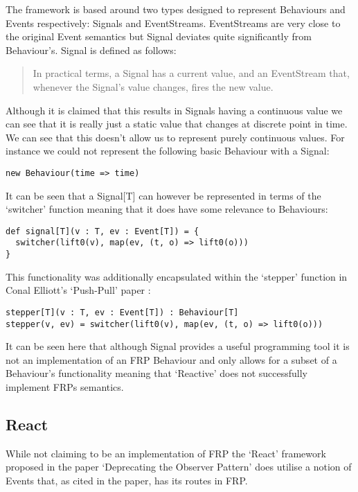       The framework is based around two types designed to represent Behaviours and Events respectively: Signals
      and EventStreams. EventStreams are very close to the original Event semantics but Signal deviates quite significantly from 
      Behaviour's. Signal is defined as follows:

      \begin{quote}
        In practical terms, a Signal has a current value, and an EventStream that, whenever the Signal's value changes,     
        fires the new value.
      \end{quote}  

      Although it is claimed that this results in Signals having a continuous value we can see
      that it is really just a static value that changes at discrete point in
      time. We can see that this doesn't allow us to represent purely continuous values. For instance
      we could not represent the following basic Behaviour with a Signal:

\begin{verbatim}
new Behaviour(time => time)
\end{verbatim}

      It can be seen that a Signal[T] can however be represented in terms
      of the `switcher' function meaning that it does have some relevance to Behaviours:

\begin{verbatim}
def signal[T](v : T, ev : Event[T]) = {
  switcher(lift0(v), map(ev, (t, o) => lift0(o)))
}
\end{verbatim}  

      This functionality was additionally encapsulated within the `stepper' function in Conal Elliott's
      `Push-Pull' paper \cite{Elliott2009}:

\begin{verbatim}
stepper[T](v : T, ev : Event[T]) : Behaviour[T]
stepper(v, ev) = switcher(lift0(v), map(ev, (t, o) => lift0(o)))
\end{verbatim} 

      It can be seen here that although Signal provides a useful programming tool it is not an implementation
      of an FRP Behaviour and only allows for a subset of a Behaviour's functionality meaning that `Reactive'
      does not successfully implement FRPs semantics.

    \subsection{React}
      While not claiming to be an implementation of FRP the `React' framework proposed in the 
      paper `Deprecating the Observer Pattern' \cite{Maier2010} does utilise a notion of Events that, as cited in the paper,
      has its routes in FRP.

